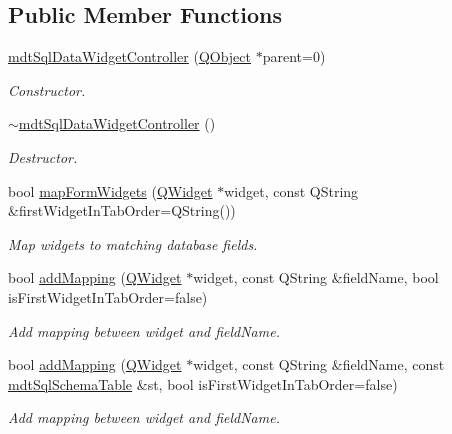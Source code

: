 \subsection*{Public Member Functions}
\begin{DoxyCompactItemize}
\item 
\hyperlink{classmdt_sql_data_widget_controller_a008f0693f9175266e4f8e473888c68e3}{mdt\-Sql\-Data\-Widget\-Controller} (\hyperlink{class_q_object}{Q\-Object} $\ast$parent=0)
\begin{DoxyCompactList}\small\item\em Constructor. \end{DoxyCompactList}\item 
\hyperlink{classmdt_sql_data_widget_controller_aa571144f07b23c84755b249ad74e6f7f}{$\sim$mdt\-Sql\-Data\-Widget\-Controller} ()
\begin{DoxyCompactList}\small\item\em Destructor. \end{DoxyCompactList}\item 
bool \hyperlink{classmdt_sql_data_widget_controller_a2bec243fc6c4c908a9c984946919e244}{map\-Form\-Widgets} (\hyperlink{class_q_widget}{Q\-Widget} $\ast$widget, const Q\-String \&first\-Widget\-In\-Tab\-Order=Q\-String())
\begin{DoxyCompactList}\small\item\em Map widgets to matching database fields. \end{DoxyCompactList}\item 
bool \hyperlink{classmdt_sql_data_widget_controller_a8234727b0d1ef9b2350775d25b2b49fb}{add\-Mapping} (\hyperlink{class_q_widget}{Q\-Widget} $\ast$widget, const Q\-String \&field\-Name, bool is\-First\-Widget\-In\-Tab\-Order=false)
\begin{DoxyCompactList}\small\item\em Add mapping between widget and field\-Name. \end{DoxyCompactList}\item 
bool \hyperlink{classmdt_sql_data_widget_controller_a6a63b9b4d7e4c17e1fc257d43322763e}{add\-Mapping} (\hyperlink{class_q_widget}{Q\-Widget} $\ast$widget, const Q\-String \&field\-Name, const \hyperlink{classmdt_sql_schema_table}{mdt\-Sql\-Schema\-Table} \&st, bool is\-First\-Widget\-In\-Tab\-Order=false)
\begin{DoxyCompactList}\small\item\em Add mapping between widget and field\-Name. \end{DoxyCompactList}\end{DoxyCompactItemize}
